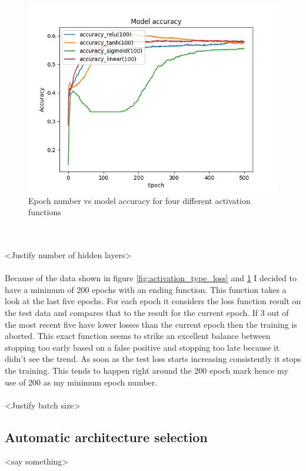\documentclass[conference]{IEEEtran}
\begin{document}
\begin{figure}
  \includegraphics[width=\linewidth]{figs/different_activation_types_accuracy.png}
  \caption{Epoch number vs model accuracy for four different activation functions}
  \label{fig:activation_type_accuracy}
\end{figure}
\\\\
<Justify number of hidden layers>
\\\\
Because of the data shown in figure \ref{fig:activation_type_loss} and \ref{fig:activation_type_accuracy} I decided to have a minimum of 200 epochs with an ending function. This function takes a look at the last five epochs. For each epoch it considers the loss function result on the test data and compares that to the result for the current epoch. If 3 out of the most recent five have lower losses than the current epoch then the training is aborted. This exact function seems to strike an excellent balance between stopping too early based on a false positive and stopping too late because it didn't see the trend. As soon as the test loss starts increasing consistently it stops the training. This tends to happen right around the 200 epoch mark hence my use of 200 as my minimum epoch number.
\\\\
<Justify batch size>



\subsection{Automatic architecture selection}
<say something>
\end{document}
